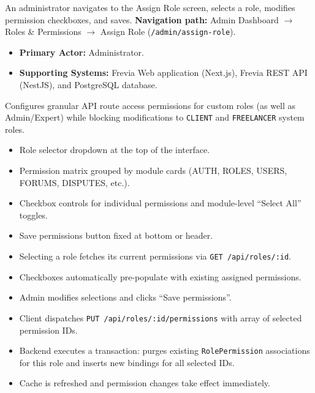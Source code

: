An administrator navigates to the Assign Role screen, selects a role, modifies permission checkboxes, and saves.\newline
\textbf{Navigation path:} Admin Dashboard $\rightarrow$ Roles \& Permissions $\rightarrow$ Assign Role (\texttt{/admin/assign-role}).


\begin{itemize}[leftmargin=1.6em,topsep=3pt,itemsep=2pt,parsep=0pt,label=$\bullet$]
    \item \textbf{Primary Actor:} Administrator.
    \item \textbf{Supporting Systems:} Frevia Web application (Next.js), Frevia REST API (NestJS), and PostgreSQL database.
\end{itemize}

\noindent Configures granular API route access permissions for custom roles (as well as Admin/Expert) while blocking modifications to \texttt{CLIENT} and \texttt{FREELANCER} system roles.

\begin{itemize}[leftmargin=1.6em,topsep=3pt,itemsep=2pt,parsep=0pt,label=$\bullet$]
    \item Role selector dropdown at the top of the interface.
    \item Permission matrix grouped by module cards (AUTH, ROLES, USERS, FORUMS, DISPUTES, etc.).
    \item Checkbox controls for individual permissions and module-level ``Select All'' toggles.
    \item Save permissions button fixed at bottom or header.
\end{itemize}

\begin{itemize}[leftmargin=1.6em,topsep=3pt,itemsep=2pt,parsep=0pt,label=$\bullet$]
    \item Selecting a role fetches its current permissions via \texttt{GET /api/roles/:id}.
    \item Checkboxes automatically pre-populate with existing assigned permissions.
    \item Admin modifies selections and clicks ``Save permissions''.
    \item Client dispatches \texttt{PUT /api/roles/:id/permissions} with array of selected permission IDs.
    \item Backend executes a transaction: purges existing \texttt{RolePermission} associations for this role and inserts new bindings for all selected IDs.
    \item Cache is refreshed and permission changes take effect immediately.
\end{itemize}

